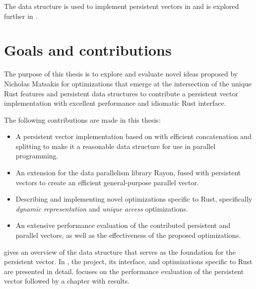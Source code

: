 The \treerrb{} data structure is used to implement persistent vectors in \pvecrs{} and is explored further in .

\section{Goals and contributions}
\label{sec:contributions}
The purpose of this thesis is to explore and evaluate novel ideas proposed by Nicholas Matsakis for optimizations that emerge at the intersection of the unique Rust features and persistent data structures to contribute a persistent vector implementation with excellent performance and idiomatic Rust interface.

The following contributions are made in this thesis:
\begin{itemize}
    \item A persistent vector implementation based on \treerrb{} with efficient concatenation and splitting to make it a reasonable data structure for use in parallel programming.
    \item An extension for the data parallelism library Rayon, fused with persistent vectors to create an efficient general-purpose parallel vector.
    \item Describing and implementing novel optimizations specific to Rust, specifically \emph{dynamic representation} and \emph{unique access} optimizations.
    \item An extensive performance evaluation of the contributed persistent and parallel vectors, as well as the effectiveness of the proposed optimizations.
\end{itemize}

 gives an overview of the \treerrb{} data structure that serves as the foundation for the persistent vector. In , the \pvecrs{} project, its interface, and optimizations specific to Rust are presented in detail.  focuses on the performance evaluation of the persistent vector followed by a chapter with results.
